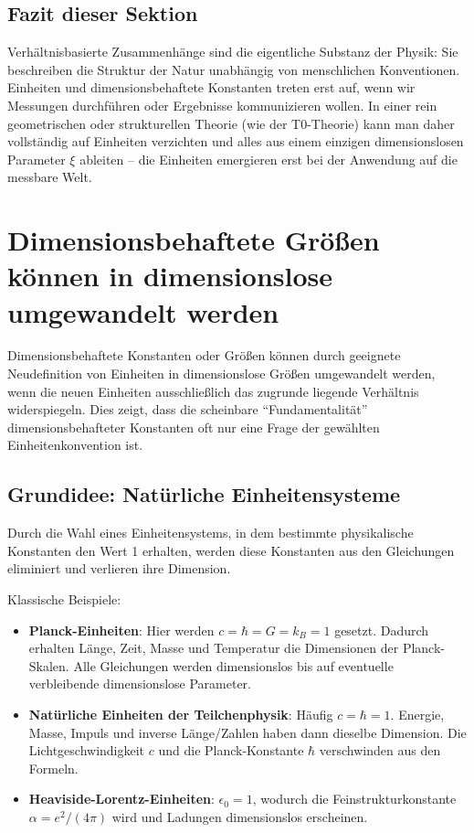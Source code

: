 \subsection{Fazit dieser Sektion}

Verhältnisbasierte Zusammenhänge sind die eigentliche Substanz der Physik: Sie beschreiben die Struktur der Natur unabhängig von menschlichen Konventionen. Einheiten und dimensionsbehaftete Konstanten treten erst auf, wenn wir Messungen durchführen oder Ergebnisse kommunizieren wollen. In einer rein geometrischen oder strukturellen Theorie (wie der T0-Theorie) kann man daher vollständig auf Einheiten verzichten und alles aus einem einzigen dimensionslosen Parameter $\xi$ ableiten – die Einheiten emergieren erst bei der Anwendung auf die messbare Welt.

\section{Dimensionsbehaftete Größen können in dimensionslose umgewandelt werden}

Dimensionsbehaftete Konstanten oder Größen können durch geeignete Neudefinition von Einheiten in dimensionslose Größen umgewandelt werden, wenn die neuen Einheiten ausschließlich das zugrunde liegende Verhältnis widerspiegeln. Dies zeigt, dass die scheinbare ``Fundamentalität'' dimensionsbehafteter Konstanten oft nur eine Frage der gewählten Einheitenkonvention ist.

\subsection{Grundidee: Natürliche Einheitensysteme}

Durch die Wahl eines Einheitensystems, in dem bestimmte physikalische Konstanten den Wert 1 erhalten, werden diese Konstanten aus den Gleichungen eliminiert und verlieren ihre Dimension.

Klassische Beispiele:
\begin{itemize}
	\item \textbf{Planck-Einheiten}: Hier werden $c = \hbar = G = k_B = 1$ gesetzt.  
	Dadurch erhalten Länge, Zeit, Masse und Temperatur die Dimensionen der Planck-Skalen. Alle Gleichungen werden dimensionslos bis auf eventuelle verbleibende dimensionslose Parameter.
	\item \textbf{Natürliche Einheiten der Teilchenphysik}: Häufig $c = \hbar = 1$.  
	Energie, Masse, Impuls und inverse Länge/Zahlen haben dann dieselbe Dimension. Die Lichtgeschwindigkeit $c$ und die Planck-Konstante $\hbar$ verschwinden aus den Formeln.
	\item \textbf{Heaviside-Lorentz-Einheiten}: $\epsilon_0 = 1$, wodurch die Feinstrukturkonstante $\alpha = e^2/(4\pi)$ wird und Ladungen dimensionslos erscheinen.
\end{itemize}

